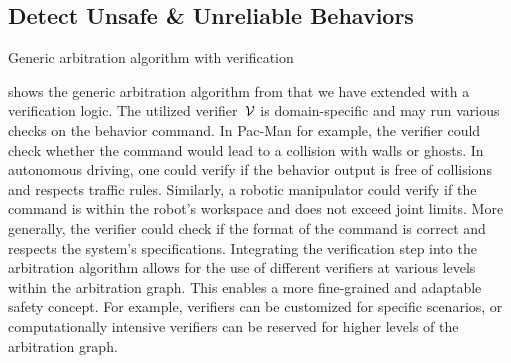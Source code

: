 \subsection{Detect Unsafe \& Unreliable Behaviors}
\begin{algorithm}

  \Fn{\BestOption{situation $\situation$}}{\label{algo:verifying_arbitrator:bestOption}
    filter applicable options $\applicableOptions \subset \options$\;
    sort applicable options
      $\sortedApplicableOptions = \left< a_0, a_1, \dots \right> = \text{strategie}(\applicableOptions)$\;

    \For{$a \in \sortedApplicableOptions$}{
      get command $\command_a = \getCommand_a(\situation)$\;

      verify $\verification_a = \verifier (\command_a)$\;
      \If{verification passed $\verification_a = 0$}{%
        \KwRet{$(\command_a, \verification_a)$}\;
      }
    }

    \KwRet{$(\emptyset, \text{NO\_SAFE\_OPTION})$}\;
    }
  \;
  \caption{Generic arbitration algorithm with verification \label{algo:verifying_arbitrator}}
\end{algorithm}

 shows the generic arbitration algorithm from \cite{lauer}
that we have extended with a verification logic.
The utilized verifier~$\mathcal{V}$ is domain-specific and may run various checks on the behavior command.
In Pac-Man for example, the verifier could check whether the command would lead to a collision with walls or ghosts.
In autonomous driving, one could verify if the behavior output is free of collisions and respects traffic rules.
Similarly, a robotic manipulator could verify if the command is within the robot's workspace and does not exceed joint limits.
More generally, the verifier could check if the format of the command is correct and respects the system's specifications.
Integrating the verification step into the arbitration algorithm allows for the use of different verifiers at various levels within the arbitration graph.
This enables a more fine-grained and adaptable safety concept.
For example, verifiers can be customized for specific scenarios, or computationally intensive verifiers can be reserved for higher levels of the arbitration graph.

